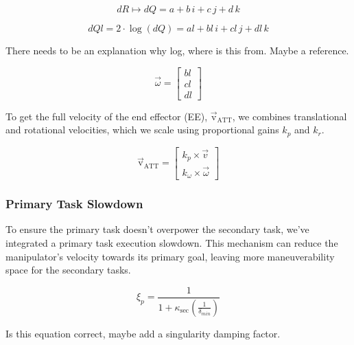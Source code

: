 \documentclass[]{article}
\begin{document}
\begin{equation}
	dR \mapsto dQ = a + b \, i + c \, j + d \, k
	\label{eq: quat_mapsto}
\end{equation}

\begin{equation}
	dQl = 2 \cdot \log(dQ) = al + bl \, i + cl \, j + dl \, k
	\label{eq:quat_log}
\end{equation}

\alert{There needs to be an explanation why log, where is this from. Maybe a reference.}



\begin{equation}
	\vec{\omega} =
	\begin{bmatrix}
		bl \\
		cl \\
		dl
	\end{bmatrix}
	\label{eq:rot_error_vector}
\end{equation}

To get the full velocity of the end effector (EE), \( \mathrm{\vec{v}_{ATT}} \), we combines translational and rotational velocities, which we scale using proportional gains \( k_p \) and \( k_r \).

\begin{equation}
	\mathrm{\vec{v}_{ATT}} = 
	\begin{bmatrix}
		k_p \times \vec{v}   \\
		k_{\omega} \times \vec{\omega}
	\end{bmatrix}
	\label{eq:ee_velocity}
\end{equation}

\subsubsection{Primary Task Slowdown}
\label{chap:primary slowdown}

To ensure the primary task doesn't overpower the secondary task, we've integrated a primary task execution slowdown. This mechanism can reduce the manipulator's velocity towards its primary goal, leaving more maneuverability space for the secondary tasks.

\begin{equation}
	\label{eq:slowdown}
	\xi_{p}=
	\frac{1}{1 + \kappa_{\text{sec}} \left(\frac{1}{\delta_{min}}\right)}
\end{equation}

\alert{Is this equation correct, maybe add a singularity damping factor.}
\end{document}
